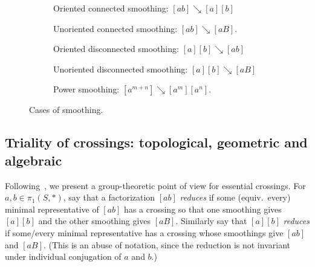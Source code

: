 \documentclass[11pt]{amsart}
\newcommand*{\svgfighuge}[1]{\fontsize{26pt}{14pt}\selectfont}
\numberwithin{equation}{section}
\numberwithin{figure}{section}
\theoremstyle{definition}
\theoremstyle{plain}
\newcommand{\reducesto}{\mathrel{\searrow}}
\begin{document}
\begin{figure}[ht]
\centering
\begin{subfigure}{0.18\textwidth}
\centering
\resizebox{\linewidth}{!}{\svgfighuge{sm_oriented_connected}}
\caption{Oriented connected smoothing: $[ab] \reducesto [a][b]$}
\label{fig:sm_oriented_connected}
\end{subfigure}
\hfill
\begin{subfigure}{0.18\textwidth}
\centering
\resizebox{\linewidth}{!}{\svgfighuge{sm_unoriented_connected}}
\caption{Unoriented connected smoothing: $[ab]\reducesto[aB]$.}
\label{fig:sm_unoriented_connected}
\end{subfigure}
\hfill
\begin{subfigure}{0.18\textwidth}
\centering
\resizebox{\linewidth}{!}{\svgfighuge{sm_oriented_disconnected}}
\caption{Oriented disconnected smoothing: $[a][b]\reducesto [ab]$}
\label{fig:sm_oriented_disconnected}
\end{subfigure}
\hfill
\begin{subfigure}{0.18\textwidth}
\centering
\resizebox{\linewidth}{!}{\svgfighuge{sm_unoriented_disconnected}}
\caption{Unoriented disconnected smoothing: $[a][b]\reducesto [aB]$}
\label{fig:sm_unoriented_disconnected}
\end{subfigure}
\hfill
\begin{subfigure}{0.18\textwidth}
\centering
\resizebox{\linewidth}{!}{\svgfighuge{sm_power}}
\caption{Power smoothing: $[a^{m+n}]\reducesto[a^m][a^n]$.}
\label{fig:sm_power}
\end{subfigure}
\caption{Cases of smoothing.}
\label{fig:cases--sm}
\end{figure}

\subsection{Triality of crossings: topological, geometric and algebraic}
\label{subsec:triality}
Following~\cite{MGT25:SmoothingsErratum}, we present a group-theoretic point of view for essential crossings. For $a,b \in \pi_1(S,*)$, say that a
factorization $[ab]$ \emph{reduces} if some (equiv.\ every) minimal
representative of $[ab]$ has a crossing so that one smoothing gives
$[a][b]$ and the other smoothing gives $[aB]$. Similarly say that
$[a][b]$ \emph{reduces} if some/every minimal representative has a crossing
whose smoothings give $[ab]$ and $[aB]$. (This is an abuse of
notation, since the reduction is not invariant under individual
conjugation of $a$ and $b$.)
\end{document}
